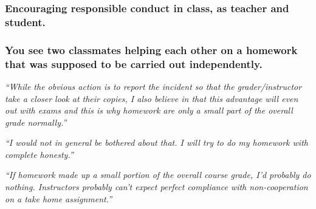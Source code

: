 \documentclass[12pt]{beamer}
\newcommand\ans[1]{{\it ``#1''}}
\newcommand\gap{\vspace{5mm}}
\begin{document}

\begin{frame}
  \frametitle{Encouraging responsible conduct in class, as teacher and student.}
\end{frame}

\begin{frame} %

\frametitle{You see two classmates helping each other on a homework that was supposed to be carried out independently.}


\ans{While the obvious action is to report the incident so that the grader/instructor take a closer look at their copies, I also believe in that this advantage will even out with exams and this is why homework are only a small part of the overall grade normally.}

\gap

\ans{I would not in general be bothered about that.  I will try to do my homework with complete honesty.}

\end{frame}

\begin{frame}
  
\ans{If  homework  made  up  a  small  portion  of  the  overall  course  grade,  I'd  probably  do nothing.  Instructors probably can’t expect perfect compliance with non-cooperation on a take home assignment.}






\end{frame}
\end{document}
